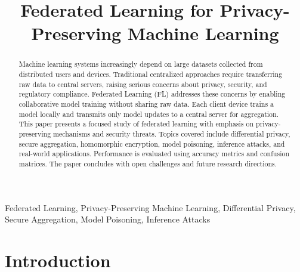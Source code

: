 \documentclass[conference]{IEEEtran}
\begin{document}
\title{Federated Learning for Privacy-Preserving Machine Learning}

\author{
\and
{}
}

\maketitle

\begin{abstract}
Machine learning systems increasingly depend on large datasets collected from distributed users and devices. Traditional centralized approaches require transferring raw data to central servers, raising serious concerns about privacy, security, and regulatory compliance. Federated Learning (FL) addresses these concerns by enabling collaborative model training without sharing raw data. Each client device trains a model locally and transmits only model updates to a central server for aggregation. This paper presents a focused study of federated learning with emphasis on privacy-preserving mechanisms and security threats. Topics covered include differential privacy, secure aggregation, homomorphic encryption, model poisoning, inference attacks, and real-world applications. Performance is evaluated using accuracy metrics and confusion matrices. The paper concludes with open challenges and future research directions.
\end{abstract}

\begin{IEEEkeywords}
Federated Learning, Privacy-Preserving Machine Learning, Differential Privacy, Secure Aggregation, Model Poisoning, Inference Attacks
\end{IEEEkeywords}

\section{Introduction}
\end{document}
